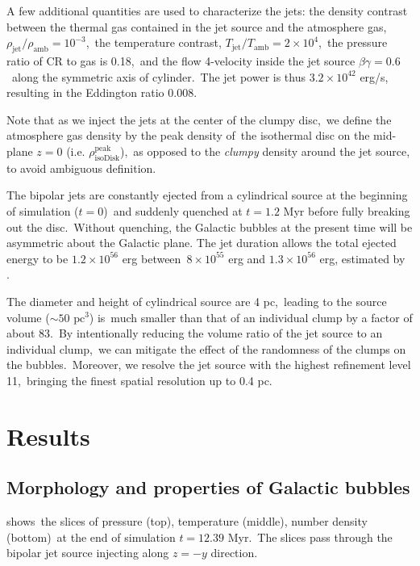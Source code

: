 \documentclass[twocolumn]{aastex631}
\begin{document}
  A few additional quantities are used to characterize the jets:
  the density contrast between the thermal gas contained in the jet source and the atmosphere gas,\
  $\rho_{\text{jet}}/\rho_{\text{amb}}=10^{-3}$,\
  the temperature contrast, $T_{\text{jet}}/T_{\text{amb}}=2\times10^{4}$,\
  the pressure ratio of CR to gas is 0.18,\
  and the flow 4-velocity inside the jet source $\beta\gamma = 0.6$\
  along the symmetric axis of cylinder.\
  The jet power is thus $3.2\times 10^{42}$ erg/s, resulting in the Eddington ratio 0.008.

  Note that as we inject the jets at the center of the clumpy disc,\
  we define the atmosphere gas density by the peak density of\
  the isothermal disc on the mid-plane $z=0$ (i.e. $\rho^{\text{peak}}_{\text{isoDisk}}$),\
  as opposed to the \textit{clumpy} density around the jet source, to avoid ambiguous definition.


  The bipolar jets are constantly ejected from a cylindrical source at the beginning of simulation ($t=0$)\
  and suddenly quenched at $t=1.2$ Myr before fully breaking out the disc.\
  Without quenching, the Galactic bubbles at the present time will be asymmetric about the Galactic plane.
  The jet duration allows the total ejected energy to be $1.2\times10^{56}$ erg between\
  $8\times10^{55}$ erg and $1.3\times10^{56}$ erg, estimated by \citet{Predehl2020}.\



  The diameter and height of cylindrical source are 4 pc,\
  leading to the source volume ($\sim 50 \text{ pc}^{3}$) is\
  much smaller than that of an individual clump by a factor of about 83.\
  By intentionally reducing the volume ratio of the jet source to an individual clump,\
  we can mitigate the effect of the randomness of the clumps on the bubbles.\
  Moreover, we resolve the jet source with the highest refinement level 11,\
  bringing the finest spatial resolution up to 0.4 pc.\



\section{Results}
\label{Results}

\subsection{Morphology and properties of Galactic bubbles}

  shows\
 the slices of pressure (top), temperature (middle), number density (bottom)\
 at the end of simulation $t=12.39$ Myr.\
 The slices pass through the bipolar jet source injecting along $z=-y$ direction.
\end{document}
